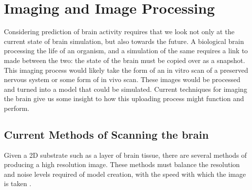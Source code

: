 \section{Imaging and Image Processing}

Considering prediction of brain activity requires that we look not only at the
current state of brain simulation, but also towards the future. A biological
brain processing the life of an organism, and a simulation of the same requires
a link to made between the two: the state of the brain must be copied over as a
snapshot. This imaging process would likely take the form of an in vitro scan of
a preserved nervous system or some form of in vivo scan. These images would be
processed and turned into a model that could be simulated. Current techniques for imaging the brain give us some insight to how this
uploading process might function and perform.

\subsection{Current Methods of Scanning the brain}

Given a 2D substrate such as a layer of brain tissue, there are several methods
of producing a high resolution image. These methods must balance the resolution
and noise levels required of model creation, with the speed with which the image
is taken \autocite{bostrom_whole_2008,mikula_progress_2016}.

